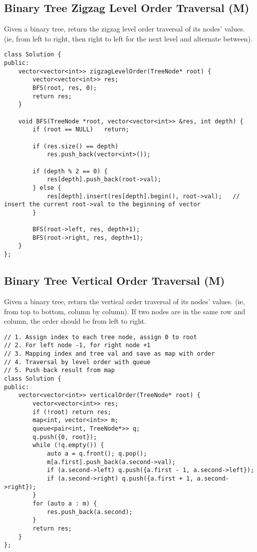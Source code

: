\subsection{Binary Tree Zigzag Level Order Traversal (M)}
Given a binary tree, return the zigzag level order traversal of its nodes' values. (ie, from left to right, then right to left for the next level and alternate between).\\

\begin{lstlisting}
class Solution {
public:
    vector<vector<int>> zigzagLevelOrder(TreeNode* root) {
        vector<vector<int>> res;
        BFS(root, res, 0);
        return res;
    }
    
    void BFS(TreeNode *root, vector<vector<int>> &res, int depth) {
        if (root == NULL)   return;
        
        if (res.size() == depth)
            res.push_back(vector<int>());  

        if (depth % 2 == 0) {                                   
            res[depth].push_back(root->val);
        } else {                                                
            res[depth].insert(res[depth].begin(), root->val);   // insert the current root->val to the beginning of vector
        }
        
        BFS(root->left, res, depth+1);  
        BFS(root->right, res, depth+1);
    }
};
\end{lstlisting}


\subsection{Binary Tree Vertical Order Traversal (M)}
Given a binary tree, return the vertical order traversal of its nodes' values. (ie, from top to bottom, column by column). If two nodes are in the same row and column, the order should be from left to right.\\

\begin{lstlisting}
// 1. Assign index to each tree node, assign 0 to root
// 2. For left node -1, for right node +1
// 3. Mapping index and tree val and save as map with order
// 4. Traversal by level order with queue
// 5. Push back result from map
class Solution {
public:
    vector<vector<int>> verticalOrder(TreeNode* root) {
        vector<vector<int>> res;
        if (!root) return res;
        map<int, vector<int>> m;
        queue<pair<int, TreeNode*>> q;
        q.push({0, root});
        while (!q.empty()) {
            auto a = q.front(); q.pop();
            m[a.first].push_back(a.second->val);
            if (a.second->left) q.push({a.first - 1, a.second->left});
            if (a.second->right) q.push({a.first + 1, a.second->right});
        }
        for (auto a : m) {
            res.push_back(a.second);
        }
        return res;
    }
};
\end{lstlisting}


